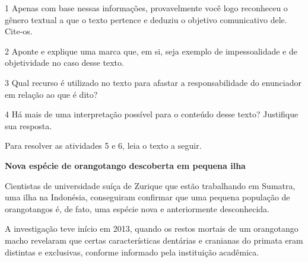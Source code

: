 \num{1} Apenas com base nessas informações, provavelmente você logo
reconheceu o gênero textual a que o texto pertence e deduziu o objetivo
comunicativo dele. Cite-os.


\num{2} Aponte e explique uma marca que, em si, seja exemplo de impessoalidade e de objetividade no caso desse texto.


\num{3} Qual recurso é utilizado no texto para afastar a responsabilidade do enunciador em relação ao que é dito?


\num{4} Há mais de uma interpretação possível para o conteúdo desse
texto? Justifique sua resposta.


Para resolver as atividades 5 e 6, leia o texto a seguir.

\begin{myquote}
\centering\textbf{Nova espécie de orangotango descoberta em pequena ilha}


Cientistas de universidade suíça de Zurique que estão trabalhando em
Sumatra, uma ilha na Indonésia, conseguiram confirmar que uma pequena
população de orangotangos é, de fato, uma espécie nova e anteriormente desconhecida.

A investigação teve início em 2013, quando os restos mortais de um
orangotango macho revelaram que certas características dentárias e
cranianas do primata eram distintas e exclusivas, conforme informado
pela instituição acadêmica.

\end{myquote}

